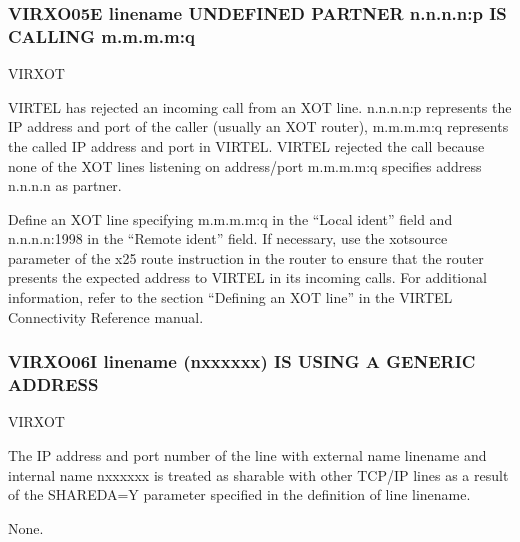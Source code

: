 \documentclass[letterpaper,10pt,english]{sphinxmanual}
\begin{document}
\subsubsection{VIRXO05E linename UNDEFINED PARTNER n.n.n.n:p IS CALLING m.m.m.m:q}
\label{\detokenize{messages:virxo05e-linename-undefined-partner-n-n-n-n-p-is-calling-m-m-m-m-q}}\begin{description}
\sphinxAtStartPar
VIRXOT

\sphinxAtStartPar
VIRTEL has rejected an incoming call from an XOT line. n.n.n.n:p represents the IP address and port of the caller (usually an XOT router), m.m.m.m:q represents the called IP address and port in VIRTEL. VIRTEL rejected the call because none of the XOT lines listening on address/port m.m.m.m:q specifies address n.n.n.n as partner.

\sphinxAtStartPar
Define an XOT line specifying m.m.m.m:q in the “Local ident” field and n.n.n.n:1998 in the “Remote ident” field. If necessary, use the xot\sphinxhyphen{}source parameter of the x25 route instruction in the router to ensure that the router presents the expected address to VIRTEL in its incoming calls. For additional information, refer to the section “Defining an XOT line” in the VIRTEL Connectivity Reference manual.

\end{description}


\subsubsection{VIRXO06I linename (n\sphinxhyphen{}xxxxxx) IS USING A GENERIC ADDRESS}
\label{\detokenize{messages:virxo06i-linename-n-xxxxxx-is-using-a-generic-address}}\begin{description}
\sphinxAtStartPar
VIRXOT

\sphinxAtStartPar
The IP address and port number of the line with external name linename and internal name n\sphinxhyphen{}xxxxxx is treated as sharable with other TCP/IP lines as a result of the SHAREDA=Y parameter specified in the definition of line linename.

\sphinxAtStartPar
None.

\end{description}
\end{document}
